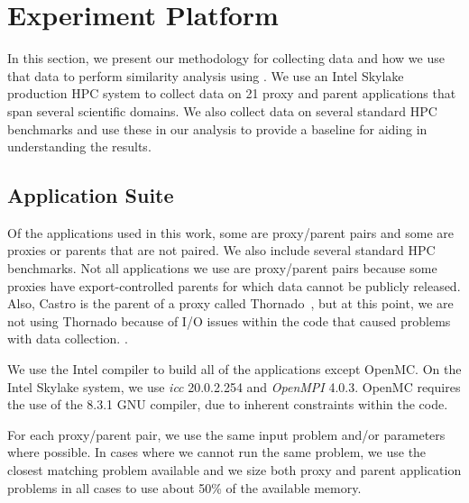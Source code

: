 \section{Experiment Platform}
\label{sec:expPlatform}
In this section, we present our methodology for collecting data and 
how we use that data to perform similarity analysis using \us.  We use
an Intel Skylake production HPC system to collect
data on 21 proxy and parent applications that span several scientific
domains.  We also collect data on several standard HPC benchmarks and 
use these in our analysis to provide a baseline for aiding in understanding the results.
 
\subsection{Application Suite}
Of the applications used in this work, some are proxy/parent pairs and
some are proxies or parents that are not paired. We also include several
standard HPC benchmarks.
Not all applications
we use are proxy/parent pairs because some proxies 
have export-controlled parents for which data cannot be 
publicly released.  Also, Castro is the parent of a 
proxy called Thornado~\cite{ECPProxySuite1}, but at this point, we are not
using Thornado because of I/O issues within the code that caused problems with 
data collection.
\cite{ECPProxySuite1}.

We use the Intel compiler to build
all of the applications except OpenMC.  
On the Intel Skylake system, we use \emph{icc} 20.0.2.254 and
\emph{OpenMPI} 4.0.3.  OpenMC requires the use of 
the 8.3.1 GNU compiler, due to inherent constraints
within the code.

For each proxy/parent pair,
we use the same input problem and/or parameters where possible. 
In cases where we cannot run the same problem, we use the closest 
matching problem available and we size both proxy and parent application
problems in all cases to use about 50\% of the available memory.   

